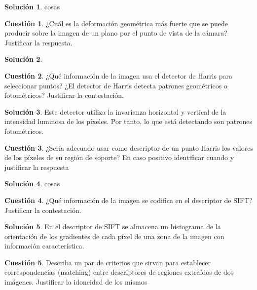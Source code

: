 \documentclass[a4paper, 11pt]{article}
\theoremstyle{definition}
\newtheorem{cuestion}{Cuestión}
\newtheorem*{solucion}{Solución}
\begin{document}
  \begin{solucion}
    cosas
  \end{solucion}

  \begin{cuestion}
    ¿Cuál es la deformación geométrica más fuerte que se puede producir sobre
    la imagen de un plano por el punto de vista de la cámara? Justificar la respuesta.
  \end{cuestion}

  \begin{solucion}

  \end{solucion}


  \begin{cuestion}
    ¿Qué información de la imagen usa el detector de Harris para seleccionar
    puntos? ¿El detector de Harris detecta patrones geométricos o fotométricos?
    Justificar la contestación.
  \end{cuestion}

  \begin{solucion}
     	Este detector utiliza la invarianza horizontal y vertical de la intensidad
      luminosa de los píxeles. Por tanto, lo que está detectando son patrones
      fotométricos.
  \end{solucion}
  \begin{cuestion}
    ¿Sería adecuado usar como descriptor de un punto Harris los valores de
    los píxeles de su región de soporte? En caso positivo identificar cuando y
    justificar la respuesta
  \end{cuestion}

  \begin{solucion}
     	cosas
  \end{solucion}
  \begin{cuestion}
    ¿Qué información de la imagen se codifica en el descriptor de SIFT?
    Justificar la contestación.
  \end{cuestion}

  \begin{solucion}
     	En el descriptor de SIFT se almacena un histograma de la orientación de los
      gradientes de cada píxel de una zona de la imagen con información característica.
  \end{solucion}

  \begin{cuestion}
    Describa un par de criterios que sirvan para establecer correspondencias
    (matching) entre descriptores de regiones extraídos de dos imágenes. Justificar
    la idoneidad de los mismos
  \end{cuestion}
\end{document}
